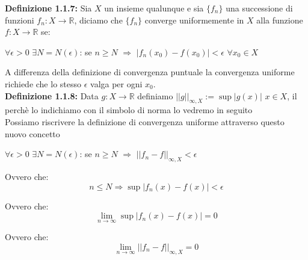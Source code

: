 \documentclass[a4paper,11pt,titlepage]{book}
\begin{document}
\textbf{Definizione 1.1.7:} Sia $X$ un insieme qualunque e sia $\{f_{n}\}$ una successione di funzioni $f_{n}:X\rightarrow\mathbb{R}$, diciamo che $\{f_{n}\}$ converge uniformemente in $X$ alla funzione $f:X\rightarrow\mathbb{R}$ se:

\begin{center}
$\forall{\epsilon{>0}}$ $\exists{N}=N(\epsilon)$: se $n\geq{N}$ $\Rightarrow$ $|f_{n}(x_{0})-f(x_{0})|<\epsilon$  $\forall{x_{0}}\in{X}$ \\
\end{center} 

A differenza della definizione di convergenza puntuale la convergenza uniforme richiede che lo stesso $\epsilon$ valga per ogni $x_0$. \\

\textbf{Definizione 1.1.8:} Data $g:X\rightarrow\mathbb{R}$ definiamo $||g||_{\infty,X}:=\sup|g(x)|$ $x\in{X}$, il perchè lo indichiamo con il simbolo di norma lo vedremo in seguito\\ 

Possiamo riscrivere la definizione di convergenza uniforme attraverso questo nuovo concetto

\begin{center}
$\forall{\epsilon{>0}}$ $\exists{N}=N(\epsilon)$: se $n\geq{N}$ $\Rightarrow$ $||f_{n}-f||_{\infty,X}<\epsilon$\\
\end{center}

Ovvero che:
$$n\leq N \Rightarrow \sup|f_n(x)-f(x)|<\epsilon$$

Ovvero che:
$$\lim_{n\to\infty}\sup|f_n(x)-f(x)|=0$$

Ovvero che:
$$\lim_{n\to\infty}||f_{n}-f||_{\infty,X}=0$$

\begin{center}
      \end{center}
      
\end{document}
